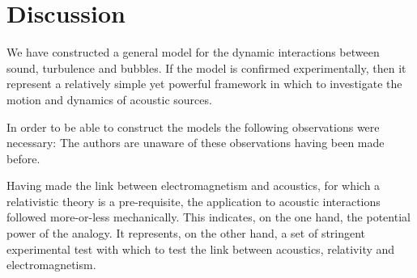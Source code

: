 \section{Discussion}\label{sec:discussion}

We have constructed a general model for the dynamic interactions between sound, turbulence and bubbles.
If the model is confirmed experimentally,
then it represent a  relatively simple yet powerful framework in which to investigate the motion and dynamics of acoustic sources.

In order to be able to construct the models the following observations were necessary:
The authors are unaware of these observations having been made before.

Having made the link between electromagnetism and acoustics, 
for which a relativistic theory is  a pre-requisite,
the application to acoustic interactions followed more-or-less mechanically.
This indicates, on the one hand, the potential power of the analogy.
It represents, on the other hand, a set of stringent experimental test with which to test the link between acoustics, relativity and electromagnetism.

